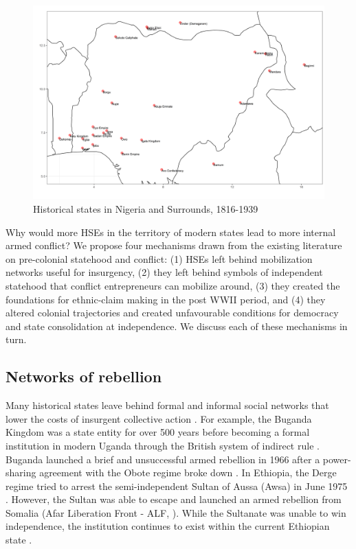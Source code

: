     \begin{figure}[!htb] \hspace{-0,5cm} \includegraphics[width=\textwidth,
    height=\textheight, keepaspectratio]{img/isd_west_africa.png}
    \caption{Historical states in Nigeria and Surrounds, 1816-1939} \label{fig:
    westafrica} \end{figure}

Why would more HSEs in the territory of modern states lead to more internal
armed conflict? We propose four mechanisms drawn from the existing literature on
pre-colonial statehood and conflict: (1) HSEs left behind mobilization networks
useful for insurgency, (2) they left behind symbols of independent statehood
that conflict entrepreneurs can mobilize around, (3) they created the
foundations for ethnic-claim making in the post WWII period, and (4) they altered
colonial trajectories and created unfavourable conditions for democracy and
state consolidation at independence. We discuss each of these mechanisms in
turn. 

\subsection{Networks of rebellion}

Many historical states leave behind formal and informal \citep{Wig2016} social
networks that lower the costs of insurgent collective action \cite[17]{Wood2000,
Staniland2014}. For example, the Buganda Kingdom was a state entity for over 500
years before becoming a formal institution in modern Uganda through the British
system of indirect rule \citep{Tuck2005}. Buganda launched a brief and
unsuccessful armed rebellion in 1966 after a power-sharing agreement with the
Obote regime broke down \citep{Tuck2005}. In Ethiopia, the Derge regime tried to arrest the
semi-independent Sultan of Aussa (Awsa) in June 1975 \citep{Shehim1985}.
However, the Sultan was able to escape and launched an armed rebellion from
Somalia (Afar Liberation Front - ALF, \citet{Shehim1985}).  While the Sultanate
was unable to win independence, the institution continues to exist within the
current Ethiopian state \citep{Hanfare2011}. 

